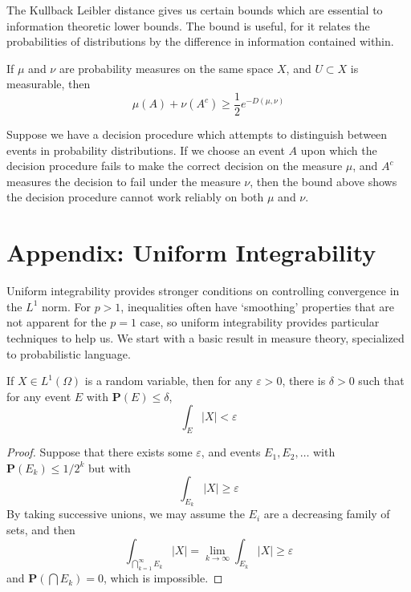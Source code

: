 The Kullback Leibler distance gives us certain bounds which are essential to information theoretic lower bounds. The bound is useful, for it relates the probabilities of distributions by the difference in information contained within.

\begin{theorem}
    If $\mu$ and $\nu$ are probability measures on the same space $X$, and $U \subset X$ is measurable, then
    \[ \mu(A) + \nu(A^c) \geq \frac{1}{2} e^{- D(\mu, \nu)} \]
\end{theorem}

Suppose we have a decision procedure which attempts to distinguish between events in probability distributions. If we choose an event $A$ upon which the decision procedure fails to make the correct decision on the measure $\mu$, and $A^c$ measures the decision to fail under the measure $\nu$, then the bound above shows the decision procedure cannot work reliably on both $\mu$ and $\nu$.




















\chapter{Appendix: Uniform Integrability}

Uniform integrability provides stronger conditions on controlling convergence in the $L^1$ norm. For $p > 1$, inequalities often have `smoothing' properties that are not apparent for the $p = 1$ case, so uniform integrability provides particular techniques to help us. We start with a basic result in measure theory, specialized to probabilistic language.

\begin{lemma}
    If $X \in L^1(\Omega)$ is a random variable, then for any $\varepsilon > 0$, there is $\delta > 0$ such that for any event $E$ with $\mathbf{P}(E) \leq \delta$,
    \[ \int_E |X| < \varepsilon \]
\end{lemma}
\begin{proof}
    Suppose that there exists some $\varepsilon$, and events $E_1, E_2, \dots$ with $\mathbf{P}(E_k) \leq 1/2^k$ but with
    \[ \int_{E_k} |X| \geq \varepsilon \]
    By taking successive unions, we may assume the $E_i$ are a decreasing family of sets, and then
    \[ \int_{\bigcap_{k = 1}^\infty E_k} |X| = \lim_{k \to \infty} \int_{E_k} |X| \geq \varepsilon \]
    and $\mathbf{P}(\bigcap E_k) = 0$, which is impossible.
\end{proof}

